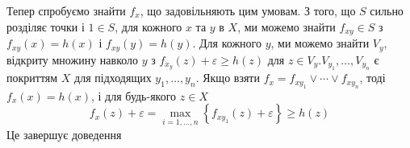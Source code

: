 Тепер спробуємо знайти $f_x$, що задовільняють цим умовам. 
З того, що $S$ сильно розділяє точки і $1 \in S$, 
для кожного $x$ та $y$ в $X$, ми можемо знайти $f_{x y} \in S$ 
з $f_{x y}(x)= h(x)$ і $f_{x y}(y)=h(y)$. 
Для кожного $y$, ми можемо знайти $V_y$, відкриту множину навколо $y$ 
з $f_{\dot{x}_y}(z)+\varepsilon \geq h(z)$ 
для $z \in V_y . V_{y_1}, \ldots, V_{y_n}$ є покриттям $X$ 
для підходящих $y_1, \ldots, y_n$. 
Якщо взяти $f_x=f_{x y_1} \vee \cdots \vee f_{x y_n}$, 
тоді $f_x(x)=h(x)$, і для будь-якого $z \in X$
$$
f_x(z)+\varepsilon=\max _{i=1, \ldots, n}\left\{f_{x y_1}(z)+\varepsilon\right\} \geq h(z)
$$
Це завершує доведення
